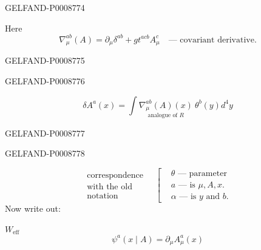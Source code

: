 \begin{GelfandAdjacentEvidence}{GELFAND-P000877}{4}


Here
\begin{equation*}
\nabla_\mu^{ab}(A)=\partial_\mu\delta^{ab}+g t^{acb}A_\mu^c
\quad\text{--- covariant derivative.}
\tag{59}
\end{equation*}
\end{GelfandAdjacentEvidence}
\begin{GelfandAdjacentEvidence}{GELFAND-P000877}{5}


\end{GelfandAdjacentEvidence}
\begin{GelfandAdjacentEvidence}{GELFAND-P000877}{6}

\begin{equation*}
\delta A^a(x)=\int\underset{\text{analogue of }R}{\nabla_\mu^{ab}(A)(x)}\ \theta^b(y)d^4y
\tag{60}
\end{equation*}
\end{GelfandAdjacentEvidence}
\begin{GelfandAdjacentEvidence}{GELFAND-P000877}{7}


\end{GelfandAdjacentEvidence}
\begin{GelfandAdjacentEvidence}{GELFAND-P000877}{8}

\begin{equation*}
\substack{\text{correspondence}\\\text{with the old}\\\text{notation}}
\quad\left[\begin{aligned}
&\theta\text{ --- parameter}\\
&a\text{ --- is }\mu,A,x.\\
&\alpha\text{ --- is }y\text{ and }b.
\end{aligned}\right.
\end{equation*}
Now write out:

$W_{\mathrm{eff}}$
\begin{equation*}
\psi^a(x\mid A)=\partial_\mu A_\mu^a(x)
\tag{61}
\end{equation*}
\end{GelfandAdjacentEvidence}

